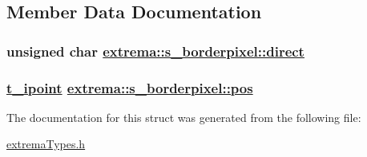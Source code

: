 \subsection{Member Data Documentation}
\hypertarget{structextrema_1_1s__borderpixel_2eaf0ce8aedba03fb74365ac9bbbf390}{
\subsubsection[direct]{\setlength{\rightskip}{0pt plus 5cm}unsigned char \hyperlink{structextrema_1_1s__borderpixel_2eaf0ce8aedba03fb74365ac9bbbf390}{extrema::s\_\-borderpixel::direct}}}
\label{structextrema_1_1s__borderpixel_2eaf0ce8aedba03fb74365ac9bbbf390}


\hypertarget{structextrema_1_1s__borderpixel_72a12084228bf9a156f1fb9a8a74aa41}{
\subsubsection[pos]{\setlength{\rightskip}{0pt plus 5cm}\hyperlink{structextrema_1_1t__ipoint}{t\_\-ipoint} \hyperlink{structextrema_1_1s__borderpixel_72a12084228bf9a156f1fb9a8a74aa41}{extrema::s\_\-borderpixel::pos}}}
\label{structextrema_1_1s__borderpixel_72a12084228bf9a156f1fb9a8a74aa41}




The documentation for this struct was generated from the following file:\begin{CompactItemize}
\item 
\hyperlink{extremaTypes_8h}{extrema\-Types.h}\end{CompactItemize}
